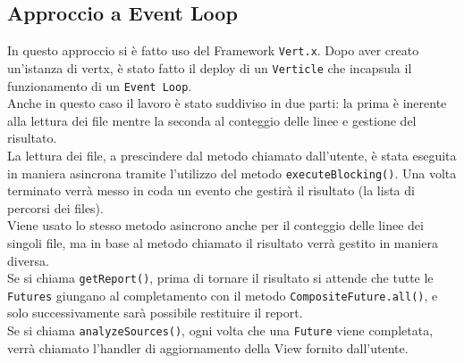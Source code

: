 \documentclass{article}
\begin{document}
    \subsection{Approccio a Event Loop}
    In questo approccio si è fatto uso del Framework \texttt{Vert.x}.
    Dopo aver creato un’istanza di vertx, è stato fatto il deploy di un \texttt{Verticle} che incapsula il funzionamento di un \texttt{Event Loop}.
    \\
    Anche in questo caso il lavoro è stato suddiviso in due parti: la prima è inerente alla lettura dei file mentre la seconda al conteggio delle linee e gestione del risultato.
    \\
    La lettura dei file, a prescindere dal metodo chiamato dall’utente, è stata eseguita in maniera asincrona tramite l’utilizzo del metodo \texttt{executeBlocking()}. Una volta terminato verrà messo in coda un evento che gestirà il risultato (la lista di percorsi dei files).
    \\
    Viene usato lo stesso metodo asincrono anche per il conteggio delle linee dei singoli file, ma in base al metodo chiamato il risultato verrà gestito in maniera diversa.
    \\
    Se si chiama \texttt{getReport()}, prima di tornare il risultato si attende che tutte le \texttt{Futures} giungano al completamento con il metodo \texttt{CompositeFuture.all()}, e solo successivamente sarà possibile restituire il report.
    \\
    Se si chiama \texttt{analyzeSources()}, ogni volta che una \texttt{Future} viene completata, verrà chiamato l’handler di aggiornamento della View fornito dall’utente.
\end{document}
